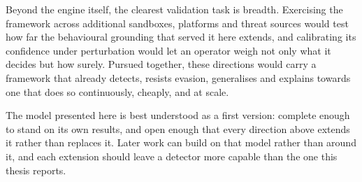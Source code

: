 \documentclass[%
    BCOR=10mm,
    DIV=13,
    toc=bibliography,
    toc=listof,
    oneside,
    12pt,
]{scrbook}
\begin{document}
Beyond the engine itself, the clearest validation task is breadth. Exercising the
framework across additional sandboxes, platforms and threat sources would test how
far the behavioural grounding that served it here extends, and calibrating its
confidence under perturbation would let an operator weigh not only what it decides
but how surely. Pursued together, these directions would carry a framework that
already detects, resists evasion, generalises and explains towards one that does so
continuously, cheaply, and at scale.

The model presented here is best understood as a first version: complete enough
to stand on its own results, and open enough that every direction above extends
it rather than replaces it. Later work can build on that model rather than
around it, and each extension should leave a detector more capable than the one
this thesis reports.

\begingroup
{}
\let\oldthebibliography\thebibliography
\renewcommand{\thebibliography}[1]{%
  \oldthebibliography{#1}%
  \setlength{\itemsep}{7pt}%
  \setlength{\parskip}{0pt}%
}


\endgroup
\end{document}
